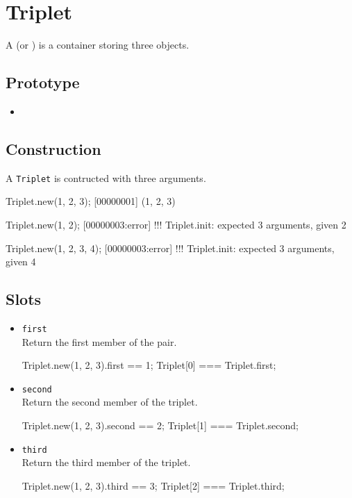 \section{Triplet}

A  (or ) is a container storing three
objects.

\subsection{Prototype}
\begin{itemize}
\item {}
\end{itemize}

\subsection{Construction}

A \lstinline|Triplet| is contructed with three arguments.

\begin{urbiscript}
Triplet.new(1, 2, 3);
[00000001] (1, 2, 3)

Triplet.new(1, 2);
[00000003:error] !!! Triplet.init: expected 3 arguments, given 2

Triplet.new(1, 2, 3, 4);
[00000003:error] !!! Triplet.init: expected 3 arguments, given 4
\end{urbiscript}

\subsection{Slots}
\begin{itemize}
\item \lstinline|first|\\
  Return the first member of the pair.
\begin{urbiassert}[firstnumber=last]
Triplet.new(1, 2, 3).first == 1;
Triplet[0] === Triplet.first;
\end{urbiassert}

\item \lstinline|second|\\
  Return the second member of the triplet.
\begin{urbiassert}[firstnumber=last]
Triplet.new(1, 2, 3).second == 2;
Triplet[1] === Triplet.second;
\end{urbiassert}

\item \lstinline|third|\\
  Return the third member of the triplet.
\begin{urbiassert}[firstnumber=last]
Triplet.new(1, 2, 3).third == 3;
Triplet[2] === Triplet.third;
\end{urbiassert}
\end{itemize}



